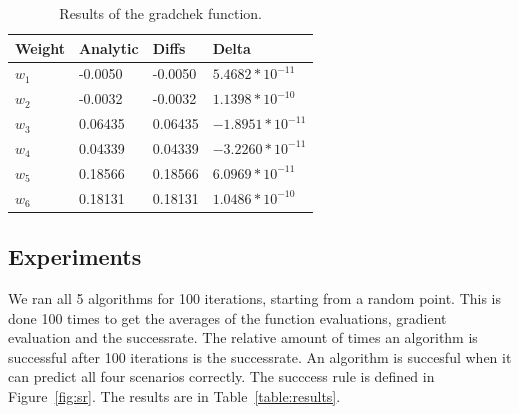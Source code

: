 \documentclass{article}
\begin{document}

	

\begin{table}[H]
	\centering
	\begin{tabular}{| l | l | l | l |}
		\hline
		Weight & Analytic & Diffs & Delta \\ \hline
$w_1$ & -0.0050 & -0.0050 & $5.4682*10^{-11}$ \\ \hline
$w_2$ & -0.0032 & -0.0032 & $1.1398*10^{-10}$ \\ \hline
$w_3$ & 0.06435 & 0.06435 & $-1.8951*10^{-11}$ \\ \hline
$w_4$ & 0.04339 & 0.04339 & $-3.2260*10^{-11}$ \\ \hline
$w_5$ & 0.18566 & 0.18566 & $6.0969*10^{-11}$ \\ \hline
$w_6$ & 0.18131 & 0.18131 & $1.0486*10^{-10}$ \\ \hline
	\end{tabular}
	\caption{Results of the gradchek function.}
	\label{table:gradchek}
\end{table}

\subsection{Experiments}
We ran all 5 algorithms for 100 iterations, starting from a random point. This is done 100 times to get the averages of the function evaluations, gradient evaluation and the successrate. The relative amount of times an algorithm is successful after 100 iterations is the successrate. An algorithm is succesful when it can predict all four scenarios correctly. The succcess rule is defined in Figure~\ref{fig:sr}. The results are in Table~\ref{table:results}. 
\end{document}
